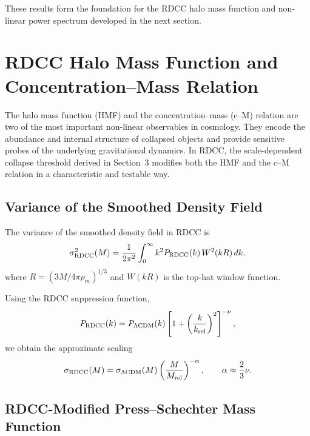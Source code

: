 \documentclass[11pt,a4paper]{article}
\begin{document}
These results form the foundation for the RDCC halo mass function and non-linear power
spectrum developed in the next section.
\section{RDCC Halo Mass Function and Concentration–Mass Relation}

The halo mass function (HMF) and the concentration–mass (c–M) relation are two of the most
important non-linear observables in cosmology. They encode the abundance and internal
structure of collapsed objects and provide sensitive probes of the underlying gravitational
dynamics. In RDCC, the scale-dependent collapse threshold derived in Section~3 modifies both
the HMF and the c–M relation in a characteristic and testable way.

\subsection{Variance of the Smoothed Density Field}

The variance of the smoothed density field in RDCC is
\begin{equation}
\sigma^2_{\rm RDCC}(M)
= \frac{1}{2\pi^2}
\int_0^\infty k^2 P_{\rm RDCC}(k)\,W^2(kR)\,dk,
\end{equation}
where $R = (3M/4\pi\rho_m)^{1/3}$ and $W(kR)$ is the top-hat window function.

Using the RDCC suppression function,
\begin{equation}
P_{\rm RDCC}(k)
= P_{\Lambda{\rm CDM}}(k)
\left[1 + \left(\frac{k}{k_{\rm rel}}\right)^2\right]^{-\nu},
\end{equation}
we obtain the approximate scaling
\begin{equation}
\sigma_{\rm RDCC}(M)
= \sigma_{\Lambda{\rm CDM}}(M)
\left(\frac{M}{M_{\rm rel}}\right)^{-\alpha},
\qquad
\alpha \approx \frac{2}{3}\nu.
\end{equation}

\subsection{RDCC-Modified Press–Schechter Mass Function}
\end{document}
